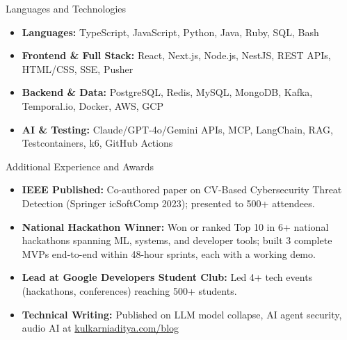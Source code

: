 \documentclass[]{mcdowellcv}
\begin{document}
\begin{cvsection}{Languages and Technologies}
  \begin{cvsubsection}{}{}{}
    \begin{itemize}
      \item \textbf{Languages:} TypeScript, JavaScript, Python, Java, Ruby, SQL, Bash
      \item \textbf{Frontend \& Full Stack:} React, Next.js, Node.js, NestJS, REST APIs, HTML/CSS, SSE, Pusher
      \item \textbf{Backend \& Data:} PostgreSQL, Redis, MySQL, MongoDB, Kafka, Temporal.io, Docker, AWS, GCP
      \item \textbf{AI \& Testing:} Claude/GPT-4o/Gemini APIs, MCP, LangChain, RAG, Testcontainers, k6, GitHub Actions
    \end{itemize}
  \end{cvsubsection}
\end{cvsection}

\begin{cvsection}{Additional Experience and Awards}
  \begin{cvsubsection}{}{}{}
    \begin{itemize}
      \item \textbf{IEEE Published:} Co-authored paper on CV-Based Cybersecurity Threat Detection (Springer icSoftComp 2023); presented to 500+ attendees.
      \item \textbf{National Hackathon Winner:} Won or ranked Top 10 in 6+ national hackathons spanning ML, systems, and developer tools; built 3 complete MVPs end-to-end within 48-hour sprints, each with a working demo.
      \item \textbf{Lead at Google Developers Student Club:} Led 4+ tech events (hackathons, conferences) reaching 500+ students.
      \item \textbf{Technical Writing:} Published on LLM model collapse, AI agent security, audio AI at \href{https://www.kulkarniaditya.com/blog}{kulkarniaditya.com/blog}
    \end{itemize}
  \end{cvsubsection}
\end{cvsection}
\end{document}
